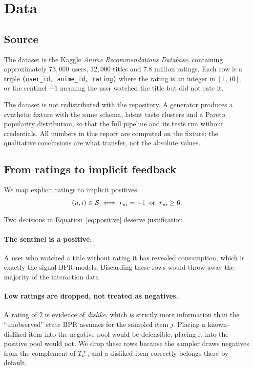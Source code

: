 \section{Data}
\label{sec:data}

\subsection{Source}

The dataset is the Kaggle \emph{Anime Recommendations Database}, containing
approximately $73{,}000$ users, $12{,}000$ titles and $7.8$ million ratings.
Each row is a triple \texttt{(user\_id, anime\_id, rating)} where the rating
is an integer in $[1,10]$, or the sentinel $-1$ meaning the user watched the
title but did not rate it.

The dataset is not redistributed with the repository. A generator produces a
synthetic fixture with the same schema, latent taste clusters and a Pareto
popularity distribution, so that the full pipeline and its tests run without
credentials. All numbers in this report are computed on the fixture; the
qualitative conclusions are what transfer, not the absolute values.

\subsection{From ratings to implicit feedback}

We map explicit ratings to implicit positives:
\begin{equation}
  (u,i) \in \mathcal{S}
  \iff
  r_{ui} = -1 \;\;\text{or}\;\; r_{ui} \geq 6 .
  \label{eq:positive}
\end{equation}

Two decisions in Equation~\ref{eq:positive} deserve justification.

\paragraph{The sentinel is a positive.} A user who watched a title without
rating it has revealed consumption, which is exactly the signal BPR models.
Discarding these rows would throw away the majority of the interaction data.

\paragraph{Low ratings are dropped, not treated as negatives.} A rating of $2$
is evidence of \emph{dislike}, which is strictly more information than the
``unobserved'' state BPR assumes for the sampled item $j$. Placing a
known-disliked item into the negative pool would be defensible; placing it
into the positive pool would not. We drop these rows because the sampler
draws negatives from the complement of $\mathcal{I}_u^{+}$, and a disliked item
correctly belongs there by default.

